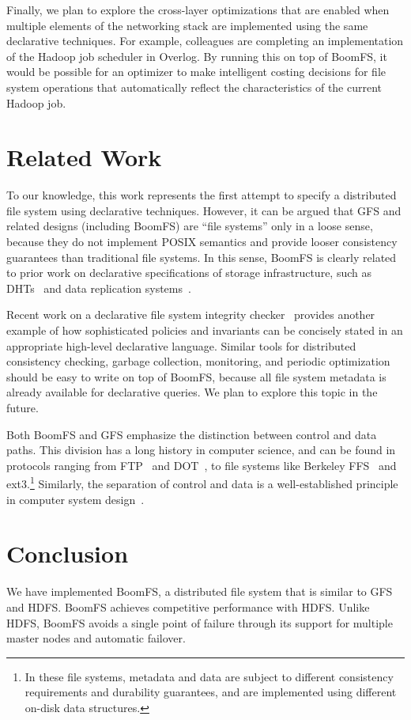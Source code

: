 \documentclass[twocolumn]{article}
\begin{document}
Finally, we plan to explore the cross-layer optimizations that are
enabled when multiple elements of the networking stack are implemented
using the same declarative techniques. For example, colleagues are
completing an implementation of the Hadoop job scheduler in
Overlog. By running this on top of BoomFS, it would be possible for an
optimizer to make intelligent costing decisions for file system
operations that automatically reflect the characteristics of the
current Hadoop job.

\section{Related Work}
\label{related-work}
To our knowledge, this work represents the first attempt to specify a
distributed file system using declarative techniques. However, it can
be argued that GFS and related designs (including BoomFS) are
``file systems'' only in a loose sense, because they do not implement
POSIX semantics and provide looser consistency guarantees than
traditional file systems. In this sense, BoomFS is clearly related to
prior work on declarative specifications of storage infrastructure,
such as DHTs~\cite{chord-overlog} and data replication
systems~\cite{padre-draft}.

Recent work on a declarative file system integrity checker~\cite{sqck}
provides another example of how sophisticated policies and invariants
can be concisely stated in an appropriate high-level declarative
language. Similar tools for distributed consistency checking, garbage
collection, monitoring, and periodic optimization should be easy to
write on top of BoomFS, because all file system metadata is already
available for declarative queries. We plan to explore this topic in
the future.

Both BoomFS and GFS emphasize the distinction between control and data
paths. This division has a long history in computer science, and can
be found in protocols ranging from FTP~\cite{ftp-rfc} and
DOT~\cite{dot}, to file systems like Berkeley FFS~\cite{ffs} and
ext3.\footnote{In these file systems, metadata and data are subject to
  different consistency requirements and durability guarantees, and
  are implemented using different on-disk data structures.} Similarly,
the separation of control and data is a well-established principle in
computer system design~\cite{hydra-policy-mech-sep}.

\section{Conclusion}
\label{conclusion}
We have implemented BoomFS, a distributed file system that is similar
to GFS and HDFS. BoomFS achieves competitive performance with
HDFS. Unlike HDFS, BoomFS avoids a single point of failure through its
support for multiple master nodes and automatic failover.
\end{document}
